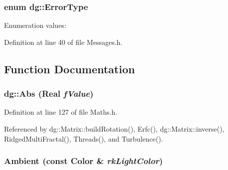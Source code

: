 \subsubsection{\setlength{\rightskip}{0pt plus 5cm}enum dg::Error\-Type}\label{namespacedg_a204}


\begin{Desc}
\item[Enumeration values: ]\par
\begin{description}
\item[{\em 
{\em ERROR\_\-IGNORE}\label{namespacedg_a204a46}
}]\item[{\em 
{\em ERROR\_\-CONTINUE}\label{namespacedg_a204a47}
}]\item[{\em 
{\em ERROR\_\-ABORT}\label{namespacedg_a204a48}
}]\end{description}
\end{Desc}



Definition at line 40 of file Messages.h.

\subsection{Function Documentation}
\subsubsection{ dg::Abs ({\bf Real} {\em f\-Value})\hspace{0.3cm}{\tt  [inline]}}\label{namespacedg_a90}




Definition at line 127 of file Maths.h.

Referenced by dg::Matrix::build\-Rotation(), Erfc(), dg::Matrix::inverse(), Ridged\-Multi\-Fractal(), Threads(), and Turbulence().
\subsubsection{ Ambient (const {\bf Color} \& {\em rk\-Light\-Color})\hspace{0.3cm}{\tt  [inline]}}\label{namespacedg_a172}




